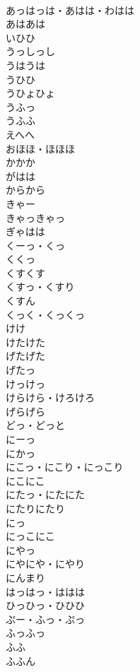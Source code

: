 \documentclass[8pt]{extreport}
\begin{document}
\begin{CJK}{UTF8}{min}
\\	あっはっは・あはは・わはは	
\\	あはあは	
\\	いひひ	
\\	うっしっし	
\\	うはうは	
\\	うひひ	
\\	うひょひょ	
\\	うふっ	
\\	うふふ	
\\	えへへ	
\\	おほほ・ほほほ	
\\	かかか	
\\	がはは	
\\	からから	
\\	きゃー	
\\	きゃっきゃっ	
\\	ぎゃはは	
\\	くーっ・くっ	
\\	くくっ	
\\	くすくす	
\\	くすっ・くすり	
\\	くすん	
\\	くっく・くっくっ	
\\	けけ	
\\	けたけた	
\\	げたげた	
\\	げたっ	
\\	けっけっ	
\\	けらけら・けろけろ	
\\	げらげら	
\\	どっ・どっと	
\\	にーっ	
\\	にかっ	
\\	にこっ・にこり・にっこり	
\\	にこにこ	
\\	にたっ・にたにた	
\\	にたりにたり	
\\	にっ	
\\	にっこにこ	
\\	にやっ	
\\	にやにや・にやり	
\\	にんまり	
\\	はっはっ・ははは	
\\	ひっひっ・ひひひ	
\\	ぷー・ふっ・ぷっ	
\\	ふっふっ	
\\	ふふ	
\\	ふふん	

\end{CJK}
\end{document}
